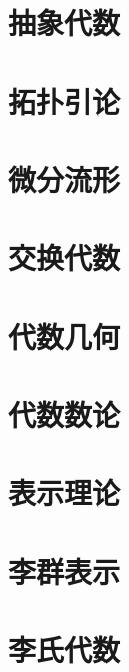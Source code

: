 \documentclass[12pt,oneside,a4paper]{book}
\begin{document}
\part{\kaishu 抽象代数}



\part{\kaishu 拓扑引论}



\part{\kaishu 微分流形}



\part{\kaishu 交换代数}



\part{\kaishu 代数几何}



\part{\kaishu 代数数论}



\part{\kaishu 表示理论}



\part{\kaishu 李群表示}



\part{\kaishu 李氏代数}
\end{document}

